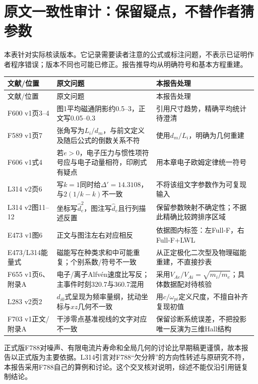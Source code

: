 \section{原文一致性审计：保留疑点，不替作者猜参数}
\label{sec:remaining-audit}
本表针对实际核读版本。它记录需要读者注意的公式或标注问题，不表示已证明作者程序错误；版本不同也可能已修正。报告推导均从明确符号和基本方程重建。
\begin{longtable}{P{24mm}P{76mm}P{49mm}}
\toprule 文献/位置 & 原文问题 & 本报告处理\\\midrule\endfirsthead
\toprule 文献/位置 & 原文问题 & 本报告处理\\\midrule\endhead
F600 v1页3--4 & 图1平均磁通阴影约0.5--3，正文写0.05--0.3 & 引用尺寸趋势，精确平均统计待澄清\\
F589 v1页7 & 张角写为$L_i/d_m$，与前文定义及随后公式的倒数关系不符 & 使用$d_m/L_i$，明确为几何重建\\
F606 v1式4 & 若$e>0$，电子压力与惯性项符号应与电子动量相符，印刷式有疑点 & 用本章电子欧姆定律统一符号\\
L314 v2页6 & 写$k=1$同时给$\Delta'=14.3108$，与$2(1/k-k)$不一致 & 不将该组文字参数作为可复现输入\\
L314 v2图11--12 & 坐标写$\hat d_e^2$，图注写$\hat d_e$且行列描述反置 & 保留参数映射不确定性；不据此精确比较跨排序区域\\
E473 v1图6 & 正文与图注左右对应相反 & 依据图内标签：左Full-F，右Full-F+LWL\\
E473/L314能量式 & 磁能写在种类求和中可能重复；个别系数/符号不一致 & 从正定极化二次型及物理磁能重建，不直接抄表\\
F655 v1页6、附录A & 电子/离子Alfvén速度比写反；主事件时刻320.7与360.7混用 & 采用$V_{Ae}/V_{Ai}=\sqrt{m_i/m_e}$；具体数据配对待核验\\
L283 v2页2 & $d_{i0}$式呈现为频率量纲，扰动坐标与$xz$几何不一致 & 用$c/\omega_{pi}$定义尺度，不擅自补齐复现初值\\
F703 v1正文/附录A & 干涉零点基准视线的文字对应不一致 & 保留诊断系统误差，不把投影唯一反演为三维Hall结构\\
\bottomrule
\end{longtable}

正式版F788对噪声、有限电流片寿命和全局几何的讨论比早期稿更谨慎，故本报告以正式版为主要依据。L314引言对F788“欠分辨”的方向性转述与原研究不符，本报告采用F788自己的算例和讨论。这个交叉核对说明，综述不能仅沿引用链复制结论。

